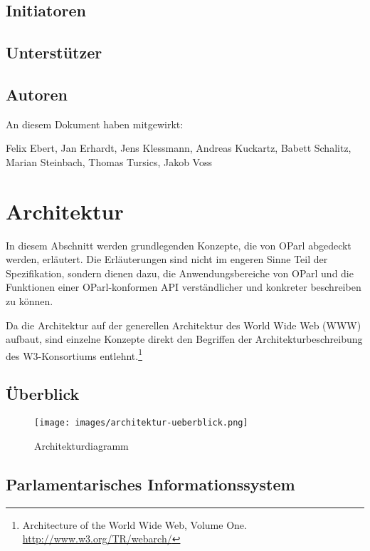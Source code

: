 \documentclass[,a4paper]{article}
\makeatletter
\def\maxwidth{\ifdim\Gin@nat@width>\linewidth\linewidth
\else\Gin@nat@width\fi}
\let\Oldincludegraphics\includegraphics
\renewcommand{\includegraphics}[1]{\Oldincludegraphics[width=\maxwidth]{#1}}
\makeatother
\begin{document}
\subsection{Initiatoren}\label{initiatoren}

\subsection{Unterstützer}\label{unterstuxfctzer}

\subsection{Autoren}\label{autoren}

An diesem Dokument haben mitgewirkt:

Felix Ebert, Jan Erhardt, Jens Klessmann, Andreas Kuckartz, Babett
Schalitz, Marian Steinbach, Thomas Tursics, Jakob Voss

\section{Architektur}\label{architektur}

In diesem Abschnitt werden grundlegenden Konzepte, die von OParl
abgedeckt werden, erläutert. Die Erläuterungen sind nicht im engeren
Sinne Teil der Spezifikation, sondern dienen dazu, die
Anwendungsbereiche von OParl und die Funktionen einer OParl-konformen
API verständlicher und konkreter beschreiben zu können.

Da die Architektur auf der generellen Architektur des World Wide Web
(WWW) aufbaut, sind einzelne Konzepte direkt den Begriffen der
Architekturbeschreibung des W3-Konsortiums entlehnt.\footnote{Architecture
  of the World Wide Web, Volume One. \url{http://www.w3.org/TR/webarch/}}

\subsection{Überblick}\label{uxfcberblick}

\begin{figure}[htbp]
\centering
\texttt{[image: images/architektur-ueberblick.png]}
\caption{Architekturdiagramm}
\end{figure}

\subsection{Parlamentarisches
Informationssystem}\label{parlamentarisches-informationssystem}
\end{document}
